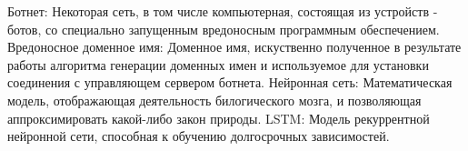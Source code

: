 
\noindent Ботнет: Некоторая сеть, в том числе компьютерная, состоящая из устройств - ботов, со специально запущенным вредоносным программным обеспечением.
\newline
\linebreak
\noindent Вредоносное доменное имя: Доменное имя, искуственно полученное в результате работы алгоритма генерации доменных имен и используемое для установки соединения с управляющем сервером ботнета.
\newline
\linebreak
\noindent Нейронная сеть: Математическая модель, отображающая деятельность билогического мозга, и позволяющая аппроксимировать какой-либо закон природы.
\newline
\linebreak
\noindent LSTM: Модель рекуррентной нейронной сети, способная к обучению долгосрочных зависимостей.
\clearpage
